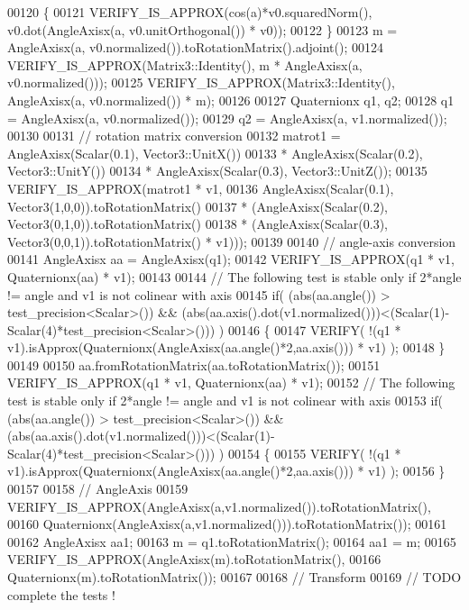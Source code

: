 \begin{DoxyCode}
00120   \{
00121     VERIFY\_IS\_APPROX(cos(a)*v0.squaredNorm(), v0.dot(AngleAxisx(a, v0.unitOrthogonal()) * v0));
00122   \}
00123   m = AngleAxisx(a, v0.normalized()).toRotationMatrix().adjoint();
00124   VERIFY\_IS\_APPROX(Matrix3::Identity(), m * AngleAxisx(a, v0.normalized()));
00125   VERIFY\_IS\_APPROX(Matrix3::Identity(), AngleAxisx(a, v0.normalized()) * m);
00126 
00127   Quaternionx q1, q2;
00128   q1 = AngleAxisx(a, v0.normalized());
00129   q2 = AngleAxisx(a, v1.normalized());
00130 
00131   \textcolor{comment}{// rotation matrix conversion}
00132   matrot1 = AngleAxisx(Scalar(0.1), Vector3::UnitX())
00133           * AngleAxisx(Scalar(0.2), Vector3::UnitY())
00134           * AngleAxisx(Scalar(0.3), Vector3::UnitZ());
00135   VERIFY\_IS\_APPROX(matrot1 * v1,
00136        AngleAxisx(Scalar(0.1), Vector3(1,0,0)).toRotationMatrix()
00137     * (AngleAxisx(Scalar(0.2), Vector3(0,1,0)).toRotationMatrix()
00138     * (AngleAxisx(Scalar(0.3), Vector3(0,0,1)).toRotationMatrix() * v1)));
00139 
00140   \textcolor{comment}{// angle-axis conversion}
00141   AngleAxisx aa = AngleAxisx(q1);
00142   VERIFY\_IS\_APPROX(q1 * v1, Quaternionx(aa) * v1);
00143   
00144   \textcolor{comment}{// The following test is stable only if 2*angle != angle and v1 is not colinear with axis}
00145   \textcolor{keywordflow}{if}( (abs(aa.angle()) > test\_precision<Scalar>()) && (abs(aa.axis().dot(v1.normalized()))<(Scalar(1)-
      Scalar(4)*test\_precision<Scalar>())) )
00146   \{
00147     VERIFY( !(q1 * v1).isApprox(Quaternionx(AngleAxisx(aa.angle()*2,aa.axis())) * v1) );
00148   \}
00149 
00150   aa.fromRotationMatrix(aa.toRotationMatrix());
00151   VERIFY\_IS\_APPROX(q1 * v1, Quaternionx(aa) * v1);
00152   \textcolor{comment}{// The following test is stable only if 2*angle != angle and v1 is not colinear with axis}
00153   \textcolor{keywordflow}{if}( (abs(aa.angle()) > test\_precision<Scalar>()) && (abs(aa.axis().dot(v1.normalized()))<(Scalar(1)-
      Scalar(4)*test\_precision<Scalar>())) )
00154   \{
00155     VERIFY( !(q1 * v1).isApprox(Quaternionx(AngleAxisx(aa.angle()*2,aa.axis())) * v1) );
00156   \}
00157 
00158   \textcolor{comment}{// AngleAxis}
00159   VERIFY\_IS\_APPROX(AngleAxisx(a,v1.normalized()).toRotationMatrix(),
00160     Quaternionx(AngleAxisx(a,v1.normalized())).toRotationMatrix());
00161 
00162   AngleAxisx aa1;
00163   m = q1.toRotationMatrix();
00164   aa1 = m;
00165   VERIFY\_IS\_APPROX(AngleAxisx(m).toRotationMatrix(),
00166     Quaternionx(m).toRotationMatrix());
00167 
00168   \textcolor{comment}{// Transform}
00169   \textcolor{comment}{// TODO complete the tests !}

\end{DoxyCode}
